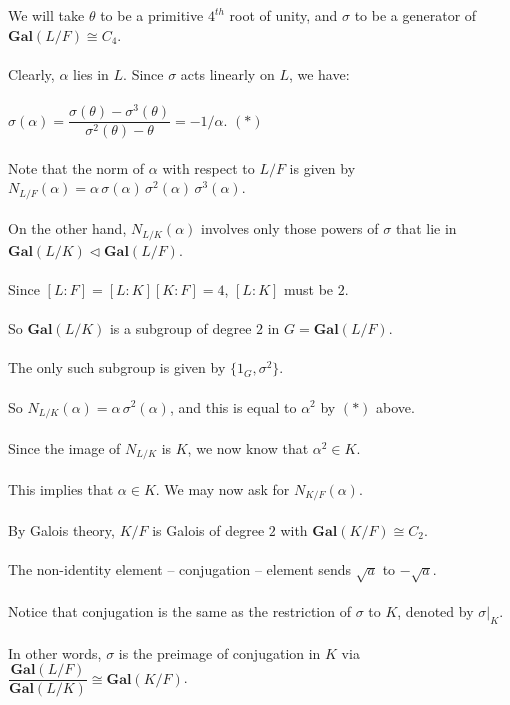 \documentclass{article}
\begin{document}
We will take $\theta$ to be a primitive $4^{th}$ root of unity, and $\sigma$ to be a generator of $\textbf{Gal}(L/F) \cong C_4$. \\\\
Clearly, $\alpha$ lies in $L$. Since $\sigma$ acts linearly on $L$, we have: \\\\
\indent $\sigma(\alpha) = \dfrac{\sigma(\theta) - \sigma^3(\theta)}{\sigma^2(\theta) - \theta} = -1/\alpha$. $(\ast)$ \\\\
Note that the norm of $\alpha$ with respect to $L/F$ is given by $N_{L/F}(\alpha) = \alpha \, \sigma(\alpha) \, \sigma^2(\alpha)\, \sigma^3(\alpha)$. \\\\
On the other hand, $N_{L/K}(\alpha)$ involves only those powers of $\sigma$ that lie in $\textbf{Gal}(L/K)\triangleleft{\textbf{Gal}(L/F)}$. \\\\
\indent Since $[L:F] = [L:K][K:F] = 4$, $[L:K]$ must be $2$. \\\\
\indent So $\textbf{Gal}(L/K)$ is a subgroup of degree $2$ in $G = \textbf{Gal}(L/F).$ \\\\
\indent The only such subgroup is given by $\{1_G, \sigma^2\}$. \\\\
So $N_{L/K}(\alpha) = \alpha \, \sigma^2(\alpha)$, and this is equal to $\alpha^2$ by $(\ast)$ above. \\\\
Since the image of $N_{L/K}$ is $K$, we now know that $\alpha^2 \in K$. \\\\
This implies that $\alpha \in K$. We may now ask for $N_{K/F}(\alpha)$. \\\\
\indent By Galois theory, $K/F$ is Galois of degree $2$ with $\textbf{Gal}(K/F) \cong C_2$. \\\\
\indent The non-identity element -- conjugation -- element sends $\sqrt{a}$ to $-\sqrt{a}$. \\\\
Notice that conjugation is the same as the restriction of $\sigma$ to $K$, denoted by $\sigma|_K$. \\\\
\indent In other words, $\sigma$ is the preimage of conjugation in $K$ via $\dfrac{\textbf{Gal}(L/F)}{\textbf{Gal}(L/K)} \cong \textbf{Gal}(K/F)$. \\\\
\end{document}
